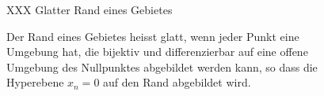 %
%
\begin{figure}
\centering
\vspace*{2cm}
XXX Glatter Rand eines Gebietes
\vspace*{2cm}
\caption{Der Rand eines Gebietes heisst glatt, wenn jeder Punkt eine
Umgebung hat, die bijektiv und differenzierbar auf eine offene Umgebung
des Nullpunktes abgebildet werden kann, so dass die Hyperebene $x_n=0$
auf den Rand abgebildet wird.
\label{buch:felder:fundamentallemma:fig:randdef}}
\end{figure}
